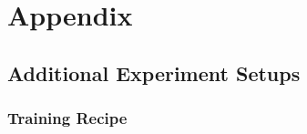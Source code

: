 \section{Appendix}
\label{sec:appendix}










\subsection{Additional Experiment Setups}
\label{sec:appendix/exp_setup}

\subsubsection{Training Recipe}
\label{sec:appendix/exp_setup/training_recipe}

